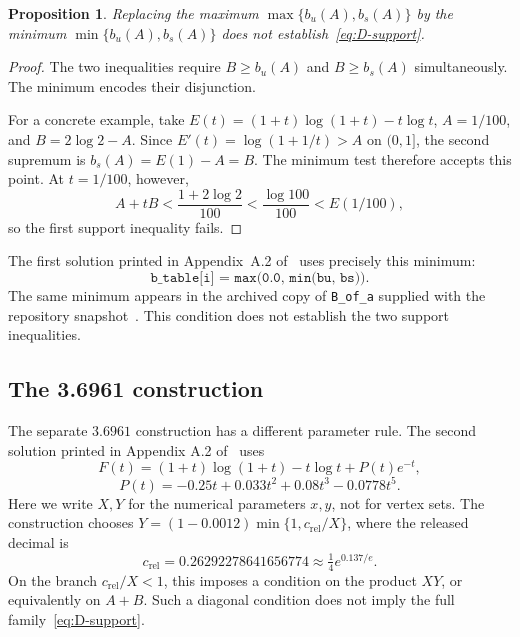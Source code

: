 \documentclass[11pt]{article}
\newtheorem{proposition}[theorem]{Proposition}
\theoremstyle{definition}
\theoremstyle{remark}
\numberwithin{equation}{section}
\begin{document}
\begin{proposition}\label{prop:D-min}
Replacing the maximum $\max\{b_u(A),b_s(A)\}$ by the minimum
$\min\{b_u(A),b_s(A)\}$ does not establish~\eqref{eq:D-support}.
\end{proposition}
\begin{proof}
The two inequalities require $B\ge b_u(A)$ and $B\ge b_s(A)$ simultaneously. The minimum encodes their disjunction.

For a concrete example, take $E(t)=(1+t)\log(1+t)-t\log t$, $A=1/100$, and $B=2\log2-A$. Since $E'(t)=\log(1+1/t)>A$ on $(0,1]$, the second supremum is $b_s(A)=E(1)-A=B$. The minimum test therefore accepts this point. At $t=1/100$, however,
\[
 A+tB<\frac{1+2\log2}{100}
 <\frac{\log100}{100}<E(1/100),
\]
so the first support inequality fails.
\end{proof}

The first solution printed in Appendix~A.2 of~\cite{Horizon} uses precisely this minimum:
\[
 \texttt{b\_table[i] = max(0.0, min(bu, bs))}.
\]
The same minimum appears in the archived copy of \texttt{B\_of\_a} supplied with the repository snapshot~\cite{HorizonCode}. This condition does not establish the two support inequalities.

\subsection{The 3.6961 construction}

The separate $3.6961$ construction has a different parameter rule. The second solution printed in Appendix A.2 of~\cite{Horizon} uses
\[
 F(t)=(1+t)\log(1+t)-t\log t+P(t)e^{-t},
\]
\[
 P(t)=-0.25t+0.033t^2+0.08t^3-0.0778t^5.
\]
Here we write $X,Y$ for the numerical parameters $x,y$, not for
vertex sets. The construction chooses
$Y=(1-0.0012)\min\{1,c_{\mathrm{rel}}/X\}$, where the released decimal is
\[
 c_{\mathrm{rel}}=0.26292278641656774
 \approx\tfrac14 e^{0.137/e}.
\]
On the branch $c_{\mathrm{rel}}/X<1$, this imposes a condition on the product $XY$, or equivalently on $A+B$. Such a diagonal condition does not imply the full family~\eqref{eq:D-support}.
\end{document}
